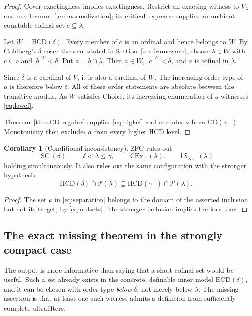 \documentclass[11pt,letterpaper]{article}
\theoremstyle{definition}
\newtheorem{corollary}[definition]{Corollary}
\newcommand{\SC}{\operatorname{SC}}
\newcommand{\CEx}{\operatorname{CEx}}
\newcommand{\CD}{\mathrm{CD}}
\newcommand{\HCD}{\mathrm{HCD}}
\newcommand{\PP}{\mathcal P}
\newcommand{\LS}{\mathsf{LS}}
\begin{document}
\begin{proof}
Cover exactingness implies exactingness. Restrict an exacting witness to $V_\lambda$ and use Lemma~\ref{lem:normalization}; its critical sequence supplies an ambient countable cofinal set $c\subseteq\lambda$.

Let $W=\HCD(\delta)$. Every member of $c$ is an ordinal and hence belongs to $W$. By Goldberg's $\delta$-cover theorem stated in Section~\ref{sec:framework}, choose $b\in W$ with $c\subseteq b$ and $|b|^W<\delta$. Put $a=b\cap\lambda$. Then $a\in W$, $|a|^W<\delta$, and $a$ is cofinal in $\lambda$.

Since $\delta$ is a cardinal of $V$, it is also a cardinal of $W$. The increasing order type of $a$ is therefore below $\delta$. All of these order statements are absolute between the transitive models. As $W$ satisfies Choice, its increasing enumeration of $a$ witnesses \eqref{eq:lowcf}.

Theorem~\ref{thm:CD-regular} supplies \eqref{eq:highcf} and excludes $a$ from $\CD(\gamma^+)$. Monotonicity then excludes $a$ from every higher $\HCD$ level.
\end{proof}

\begin{corollary}[Conditional inconsistency]\label{cor:local-inconsistency}
ZFC rules out
\[
 \SC(\delta),\qquad \delta<\lambda\leq\gamma,\qquad
 \CEx_\gamma(\lambda),\qquad
 \LS_{\delta,\gamma^+}(\lambda)
\]
holding simultaneously. It also rules out the same configuration with the stronger hypothesis
\[
 \HCD(\delta)\cap\PP(\lambda)
       \subseteq\HCD(\gamma^+)\cap\PP(\lambda).
\]
\end{corollary}

\begin{proof}
The set $a$ in \eqref{eq:separation} belongs to the domain of the asserted inclusion but not its target, by \eqref{eq:ordsets}. The stronger inclusion implies the local one.
\end{proof}

\subsection{The exact missing theorem in the strongly compact case}

The output is more informative than saying that a short cofinal set would be useful. Such a set already exists in the concrete, definable inner model $\HCD(\delta)$, and it can be chosen with order type \emph{below $\delta$}, not merely below $\lambda$. The missing assertion is that at least one such witness admits a definition from sufficiently complete ultrafilters.
\end{document}

